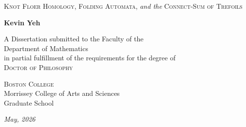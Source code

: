 \begin{titlepage}
    \centering
    \thispagestyle{empty}
    \rmfamily %
    
    \vspace*{1cm}
    
    {\Large \scshape Knot Floer Homology, Folding Automata,}
    \vspace{0.2cm}
    {\Large \itshape and the}
    \vspace{0.2cm}
    {\Large \scshape Connect-Sum of Trefoils}
    
    \vspace{2cm}
    
    {\large \bfseries Kevin Yeh}
    
    \vspace{2cm}
    
    {\large A Dissertation submitted to the Faculty of the} \\
    \vspace{0.2cm}
    {\large Department of Mathematics} \\
    \vspace{0.2cm}
    {\large in partial fulfillment of the requirements for the degree of} \\
    \vspace{0.2cm}
    {\large \scshape Doctor of Philosophy}
    
    \vfill
    
    {\Large \scshape Boston College} \\
    \vspace{0.5cm}
    {\large Morrissey College of Arts and Sciences} \\
    {\large Graduate School}
    
    \vspace{1.5cm}
    
    {\large \itshape May, 2026} 
    
\end{titlepage}